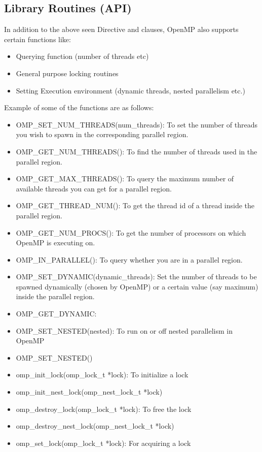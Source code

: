 \documentclass[12pt]{book}
\begin{document}
\subsection{Library Routines (API)}
In addition to the above seen Directive and clauses, OpenMP also supports certain functions like:
\begin{itemize}
    \item Querying function (number of threads etc)
    \item General purpose locking routines
    \item Setting Execution environment (dynamic threads, nested parallelism etc.)
\end{itemize}
Example of some of the functions are as follows:
\begin{itemize}
    \item OMP\_SET\_NUM\_THREADS(num\_threads): To set the number of threads you wish to spawn in the corresponding parallel region.
    \item OMP\_GET\_NUM\_THREADS(): To find the number of threads used in the parallel region.
    \item OMP\_GET\_MAX\_THREADS(): To query the maximum number of available threads you can get for a parallel region.
    \item OMP\_GET\_THREAD\_NUM(): To get the thread id of a thread inside the parallel region.
    \item OMP\_GET\_NUM\_PROCS(): To get the number of processors on which OpenMP is executing on.
    \item OMP\_IN\_PARALLEL(): To query whether you are in a parallel region.
    \item OMP\_SET\_DYNAMIC(dynamic\_threads): Set the number of threads to be spawned dynamically (chosen by OpenMP) or a certain value (say maximum) inside the parallel region.
    \item OMP\_GET\_DYNAMIC: 
    \item OMP\_SET\_NESTED(nested): To run on or off nested parallelism in OpenMP
    \item OMP\_SET\_NESTED()
    \item omp\_init\_lock(omp\_lock\_t *lock): To initialize a lock
    \item omp\_init\_nest\_lock(omp\_nest\_lock\_t *lock)
    \item omp\_destroy\_lock(omp\_lock\_t *lock): To free the lock
    \item omp\_destroy\_nest\_lock(omp\_nest\_lock\_t *lock)
    \item omp\_set\_lock(omp\_lock\_t *lock): For acquiring a lock

\end{itemize}
\end{document}
